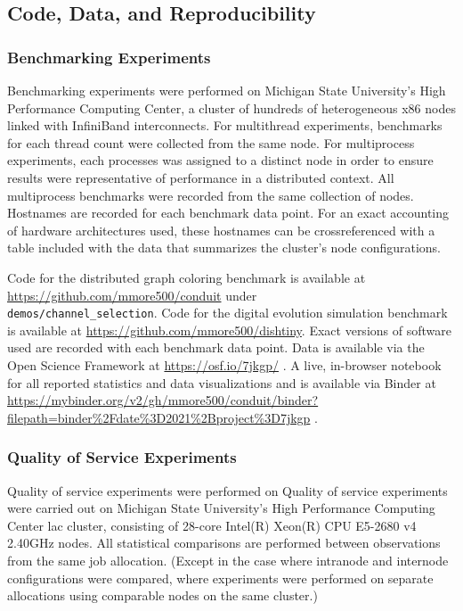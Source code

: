 \subsection{Code, Data, and Reproducibility}

\subsubsection{Benchmarking Experiments} \label{sec:methods-code-data-reproducibility-benchmarking-experiments}

Benchmarking experiments were performed on Michigan State University's High Performance Computing Center, a cluster of hundreds of heterogeneous x86 nodes linked with InfiniBand interconnects.
For multithread experiments, benchmarks for each thread count were collected from the same node.
For multiprocess experiments, each processes was assigned to a distinct node in order to ensure results were representative of performance in a distributed context.
All multiprocess benchmarks were recorded from the same collection of nodes.
Hostnames are recorded for each benchmark data point.
For an exact accounting of hardware architectures used, these hostnames can be crossreferenced with a table included with the data that summarizes the cluster's node configurations.

Code for the distributed graph coloring benchmark is available at \url{https://github.com/mmore500/conduit} under \\ \texttt{demos/channel\_selection}.
Code for the digital evolution simulation benchmark is available at \url{https://github.com/mmore500/dishtiny}.
Exact versions of software used are recorded with each benchmark data point.
Data is available via the Open Science Framework at \url{https://osf.io/7jkgp/} \citep{foster2017open}.
A live, in-browser notebook for all reported statistics and data visualizations and is available via Binder at \url{https://mybinder.org/v2/gh/mmore500/conduit/binder?filepath=binder%2Fdate%3D2021%2Bproject%3D7jkgp} \citep{jupyter2018binder}.

\subsubsection{Quality of Service Experiments}

Quality of service experiments were performed on Quality of service experiments were carried out on Michigan State University's High Performance Computing Center lac cluster, consisting of 28-core Intel(R) Xeon(R) CPU E5-2680 v4 \@ 2.40GHz nodes.
All statistical comparisons are performed between observations from the same job allocation.
(Except in the case where intranode and internode configurations were compared, where experiments were performed on separate allocations using comparable nodes on the same cluster.)

